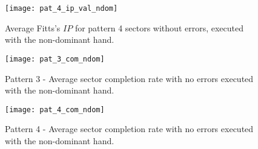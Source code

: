 \begin{appendices}
		\begin{figure}[!htb]
			\centering
			\texttt{[image: pat\_4\_ip\_val\_ndom]}
			\caption{Average Fitts's \(IP\) for pattern 4 sectors without errors, executed with the non-dominant hand.}
			\label{fi_pat_4_ip_ndom}
		\end{figure}
	
	\begin{figure}[!htb]
		\centering
		\texttt{[image: pat\_3\_com\_ndom]}
		\caption{Pattern 3 - Average sector completion rate with no errors executed with the non-dominant hand.}
		\label{fig_pat_3_com_ndom}
	\end{figure}		
	
	\begin{figure}[!htb]
		\centering
		\texttt{[image: pat\_4\_com\_ndom]}
		\caption{Pattern 4 - Average sector completion rate with no errors executed with the non-dominant hand.}
		\label{fig_pat_4_com_ndom}
	\end{figure}
	
\end{appendices}